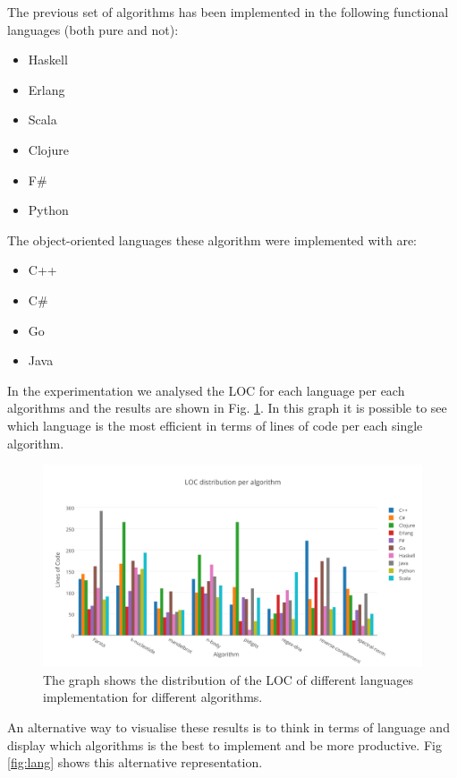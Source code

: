 \documentclass{article}
\begin{document}
The previous set of algorithms has been implemented in the following functional languages (both pure and not):

\begin{itemize}
\item Haskell
\item Erlang
\item Scala
\item Clojure
\item F\#
\item Python
\end{itemize}
The object-oriented languages these algorithm were implemented with are:

\begin{itemize}
\item C++
\item C\#
\item Go
\item Java
\end{itemize}

In the experimentation we analysed the LOC for each language per each algorithms and the results are shown in Fig. \ref{fig:alg}. In this graph it is possible to see which language is the most efficient in terms of lines of code per each single algorithm.

\begin{figure}[h]
\includegraphics[width=\textwidth]{2}
\caption{The graph shows the distribution of the LOC of different languages implementation for different algorithms.}
\label{fig:alg}
\end{figure}

An alternative way to visualise these results is to think in terms of language and display which algorithms is the best to implement and be more productive. Fig \ref{fig:lang} shows this alternative representation.
\end{document}
